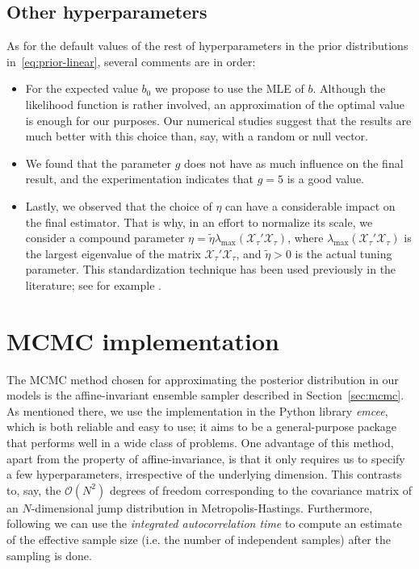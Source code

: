 \subsection*{Other hyperparameters}

As for the default values of the rest of hyperparameters in the prior distributions in~\eqref{eq:prior-linear}, several comments are in order:
\begin{itemize}
  \item For the expected value \(b_0\) we propose to use the MLE of \(b\). Although the likelihood function is rather involved, an approximation of the optimal value is enough for our purposes. Our numerical studies suggest that the results are much better with this choice than, say, with a random or null vector.
  \item We found that the parameter \(g\) does not have as much influence on the final result, and the experimentation indicates that \(g=5\) is a good value.
  \item Lastly, we observed that the choice of \(\eta\) can have a considerable impact on the final estimator. That is why, in an effort to normalize its scale, we consider a compound parameter \(\eta = \tilde \eta \lambda_{\max}(\mathcal X_\tau'\mathcal X_\tau)\), where \(\lambda_{\max}(\mathcal X_\tau'\mathcal X_\tau)\) is the largest eigenvalue of the matrix \(\mathcal X_\tau'\mathcal X_\tau\), and \(\tilde\eta > 0\) is the actual tuning parameter. This standardization technique has been used previously in the literature; see for example \citet{grollemund2019bayesian}.
\end{itemize}

\section{MCMC implementation}

The MCMC method chosen for approximating the posterior distribution in our models is the affine-invariant ensemble sampler described in Section~\ref{sec:mcmc}. As mentioned there, we use the implementation in the Python library \textit{emcee}, which is both reliable and easy to use; it aims to be a general-purpose package that performs well in a wide class of problems. One advantage of this method, apart from the property of affine-invariance, is that it only requires us to specify a few hyperparameters, irrespective of the underlying dimension. This contrasts to, say, the \(\mathcal O(N^2)\) degrees of freedom corresponding to the covariance matrix of an \(N\)-dimensional jump distribution in Metropolis-Hastings.
Furthermore, following \citet{goodman2010ensemble} we can use the \textit{integrated autocorrelation time} to compute an estimate of the effective sample size (i.e. the number of independent samples) after the sampling is done.

